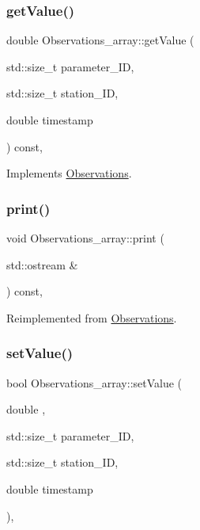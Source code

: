 \subsubsection{\texorpdfstring{get\+Value()}{getValue()}}
{\footnotesize\ttfamily double Observations\+\_\+array\+::get\+Value (\begin{DoxyParamCaption}\item[{std\+::size\+\_\+t}]{parameter\+\_\+\+ID,  }\item[{std\+::size\+\_\+t}]{station\+\_\+\+ID,  }\item[{double}]{timestamp }\end{DoxyParamCaption}) const\hspace{0.3cm}{\ttfamily [override]}, {\ttfamily [virtual]}}



Implements \mbox{\hyperlink{class_observations_ac5564bbf13e79d269407d1ecf567cd7f}{Observations}}.

\mbox{\label{class_observations__array_a2563545e5a38ec7e3ec09380c0b38855}} 
\subsubsection{\texorpdfstring{print()}{print()}}
{\footnotesize\ttfamily void Observations\+\_\+array\+::print (\begin{DoxyParamCaption}\item[{std\+::ostream \&}]{ }\end{DoxyParamCaption}) const\hspace{0.3cm}{\ttfamily [override]}, {\ttfamily [virtual]}}



Reimplemented from \mbox{\hyperlink{class_observations_a523647c5ae644959f0ed583cd7b11aba}{Observations}}.

\mbox{\label{class_observations__array_a1708fe12a750cb68bb60782ab184605b}} 
\subsubsection{\texorpdfstring{set\+Value()}{setValue()}}
{\footnotesize\ttfamily bool Observations\+\_\+array\+::set\+Value (\begin{DoxyParamCaption}\item[{double}]{,  }\item[{std\+::size\+\_\+t}]{parameter\+\_\+\+ID,  }\item[{std\+::size\+\_\+t}]{station\+\_\+\+ID,  }\item[{double}]{timestamp }\end{DoxyParamCaption})\hspace{0.3cm}{\ttfamily [override]}, {\ttfamily [virtual]}}



